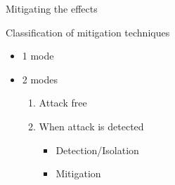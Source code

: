 \documentclass[aspectratio=169]{beamer}
\begin{document}
\begin{frame}{Mitigating the effects}
\begin{overlayarea}{\textwidth}{.4\textwidth}
{\begin{minipage}[t]{.45\linewidth}
      \end{minipage}
    }
  \end{overlayarea}
\end{frame}

\begin{frame}{Classification of mitigation techniques}
  \begin{minipage}[t]{.45\linewidth}
    \begin{itemize}
      \item<2-> 1 mode
    \end{itemize}
  \end{minipage}
  \hfill
  \begin{minipage}[t]{.45\linewidth}
    \begin{itemize}
      \item<2-> 2 modes
            \begin{enumerate}
              \item<3-> Attack free
              \item<3-> When attack is detected
                    \begin{itemize}
                      \item<4-> Detection/Isolation
                      \item<4-> Mitigation
                    \end{itemize}
            \end{enumerate}
    \end{itemize}
  \end{minipage}
\end{frame}
\end{document}
